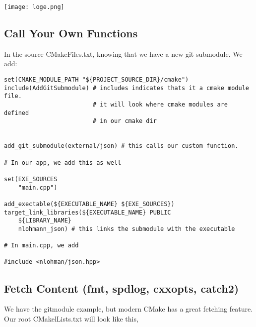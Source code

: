 \begin{center}
    \texttt{[image: loge.png]}
\end{center}



\subsection{Call Your Own Functions}

In the source CMakeFiles.txt, knowing that we have a new git submodule. We add:


\begin{verbatim}
set(CMAKE_MODULE_PATH "${PROJECT_SOURCE_DIR}/cmake")
include(AddGitSubmodule) # includes indicates thats it a cmake module file.
                         # it will look where cmake modules are defined
                         # in our cmake dir


add_git_submodule(external/json) # this calls our custom function.

# In our app, we add this as well

set(EXE_SOURCES
    "main.cpp")

add_exectable(${EXECUTABLE_NAME} ${EXE_SOURCES})
target_link_libraries(${EXECUTABLE_NAME} PUBLIC
    ${LIBRARY_NAME}
    nlohmann_json) # this links the submodule with the executable

# In main.cpp, we add 

#include <nlohman/json.hpp>
\end{verbatim}


\subsection{Fetch Content (fmt, spdlog, cxxopts, catch2)}

We have the gitmodule example, but modern CMake has a great fetching feature. Our root CMakelLists.txt will look like this, 

